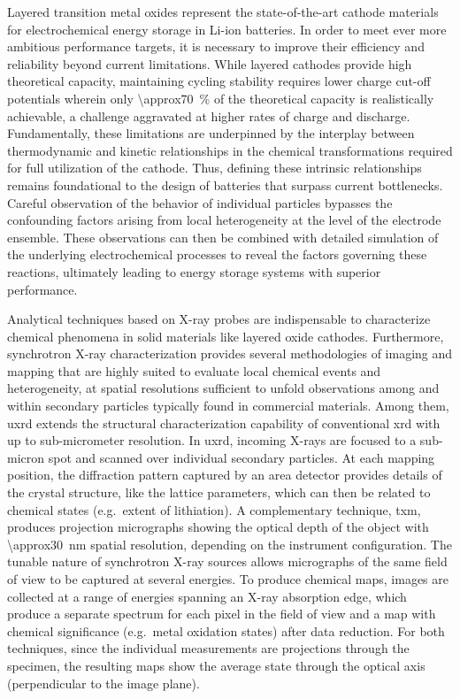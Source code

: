\documentclass{article}
\begin{document}
Layered transition metal oxides represent the state-of-the-art cathode
materials for electrochemical energy storage in Li-ion batteries. In
order to meet ever more ambitious performance targets, it is necessary
to improve their efficiency and reliability beyond current
limitations. While layered cathodes provide high theoretical capacity,
maintaining cycling stability requires lower charge cut-off potentials
wherein only \SI{\approx70}{\percent} of the theoretical capacity is
realistically achievable, a challenge aggravated at higher rates of
charge and discharge\cite{janek2019-2,chen2020-4}. Fundamentally,
these limitations are underpinned by the interplay between
thermodynamic and kinetic relationships in the chemical
transformations required for full utilization of the cathode. Thus,
defining these intrinsic relationships remains foundational to the
design of batteries that surpass current bottlenecks. Careful
observation of the behavior of individual particles bypasses the
confounding factors arising from local heterogeneity at the level of
the electrode ensemble. These observations can then be combined with
detailed simulation of the underlying electrochemical processes to
reveal the factors governing these reactions, ultimately leading to
energy storage systems with superior performance.


Analytical techniques based on X-ray probes are indispensable to
characterize chemical phenomena in solid materials like layered oxide
cathodes\cite{doeff2017}. Furthermore, synchrotron X-ray
characterization provides several methodologies of imaging and mapping
that are highly suited to evaluate local chemical events and
heterogeneity\cite{wolf2017}, at spatial resolutions sufficient to
unfold observations among and within secondary particles typically
found in commercial materials. Among them, \gls{uxrd} extends the
structural characterization capability of conventional \gls{xrd} with
up to sub-micrometer resolution. In \gls{uxrd}, incoming X-rays are
focused to a sub-micron spot and scanned over individual secondary
particles. At each mapping position, the diffraction pattern captured
by an area detector provides details of the crystal structure, like
the lattice parameters, which can then be related to chemical states
(e.g.\ extent of lithiation). A complementary technique, \Gls{txm},
produces projection micrographs showing the optical depth of the
object with \SI{\approx30}{nm} spatial resolution, depending on the
instrument configuration. The tunable nature of synchrotron X-ray
sources allows micrographs of the same field of view to be captured at
several energies. To produce chemical maps, images are collected at a
range of energies spanning an X-ray absorption edge, which produce a
separate spectrum for each pixel in the field of view and a map with
chemical significance (e.g.\ metal oxidation states) after data
reduction. For both techniques, since the individual measurements are
projections through the specimen, the resulting maps show the average
state through the optical axis (perpendicular to the image plane).
\end{document}
